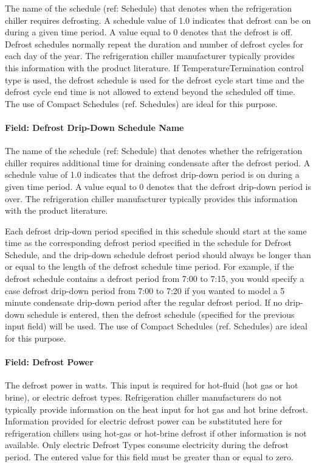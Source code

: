 The name of the schedule (ref: Schedule) that denotes when the refrigeration chiller requires defrosting. A schedule value of 1.0 indicates that defrost can be on during a given time period. A value equal to 0 denotes that the defrost is off. Defrost schedules normally repeat the duration and number of defrost cycles for each day of the year. The refrigeration chiller manufacturer typically provides this information with the product literature. If TemperatureTermination control type is used, the defrost schedule is used for the defrost cycle start time and the defrost cycle end time is not allowed to extend beyond the scheduled off time. The use of Compact Schedules (ref. Schedules) are ideal for this purpose.

\paragraph{Field: Defrost Drip-Down Schedule Name}\label{field-defrost-drip-down-schedule-name-1}

The name of the schedule (ref: Schedule) that denotes whether the refrigeration chiller requires additional time for draining condensate after the defrost period. A schedule value of 1.0 indicates that the defrost drip-down period is on during a given time period. A value equal to 0 denotes that the defrost drip-down period is over. The refrigeration chiller manufacturer typically provides this information with the product literature.

Each defrost drip-down period specified in this schedule should start at the same time as the corresponding defrost period specified in the schedule for Defrost Schedule, and the drip-down schedule defrost period should always be longer than or equal to the length of the defrost schedule time period. For example, if the defrost schedule contains a defrost period from 7:00 to 7:15, you would specify a case defrost drip-down period from 7:00 to 7:20 if you wanted to model a 5 minute condensate drip-down period after the regular defrost period. If no drip-down schedule is entered, then the defrost schedule (specified for the previous input field) will be used. The use of Compact Schedules (ref. Schedules) are ideal for this purpose.

\paragraph{Field: Defrost Power}\label{field-defrost-power-1}

The defrost power in watts. This input is required for hot-fluid (hot gas or hot brine), or electric defrost types. Refrigeration chiller manufacturers do not typically provide information on the heat input for hot gas and hot brine defrost. Information provided for electric defrost power can be substituted here for refrigeration chillers using hot-gas or hot-brine defrost if other information is not available. Only electric Defrost Types consume electricity during the defrost period. The entered value for this field must be greater than or equal to zero.

